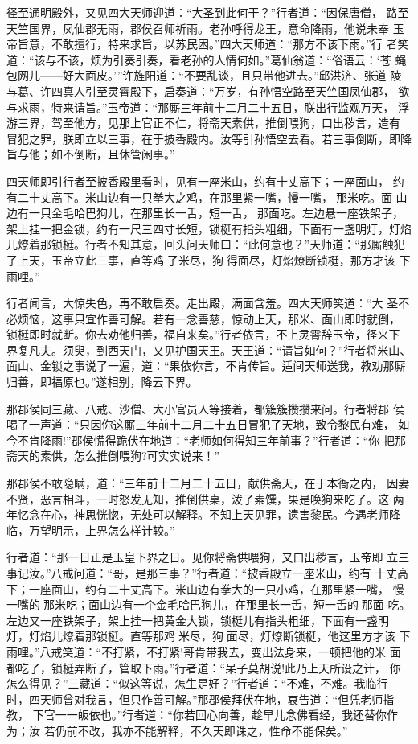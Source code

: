 径至通明殿外，又见四大天师迎道：“大圣到此何干？”行者道：“因保唐僧，
路至天竺国界，凤仙郡无雨，郡侯召师祈雨。老孙呼得龙王，意命降雨，他说未奉
玉帝旨意，不敢擅行，特来求旨，以苏民困。”四大天师道：“那方不该下雨。”行
者笑道：“该与不该，烦为引奏引奏，看老孙的人情何如。”葛仙翁道：“俗语云：‘苍
蝇包网儿——好大面皮。’”许旌阳道：“不要乱谈，且只带他进去。”邱洪济、张道
陵与葛、许四真人引至灵霄殿下，启奏道：“万岁，有孙悟空路至天竺国凤仙郡，
欲与求雨，特来请旨。”玉帝道：“那厮三年前十二月二十五日，朕出行监观万天，
浮游三界，驾至他方，见那上官正不仁，将斋天素供，推倒喂狗，口出秽言，造有
冒犯之罪，朕即立以三事，在于披香殿内。汝等引孙悟空去看。若三事倒断，即降
旨与他；如不倒断，且休管闲事。”

四天师即引行者至披香殿里看时，见有一座米山，约有十丈高下；一座面山，
约有二十丈高下。米山边有一只拳大之鸡，在那里紧一嘴，慢一嘴，那米吃。面
山边有一只金毛哈巴狗儿，在那里长一舌，短一舌，那面吃。左边悬一座铁架子，
架上挂一把金锁，约有一尺三四寸长短，锁梃有指头粗细，下面有一盏明灯，灯焰
儿燎着那锁梃。行者不知其意，回头问天师曰：“此何意也？”天师道：“那厮触犯
了上天，玉帝立此三事，直等鸡了米尽，狗得面尽，灯焰燎断锁梃，那方才该
下雨哩。”

行者闻言，大惊失色，再不敢启奏。走出殿，满面含羞。四大天师笑道：“大
圣不必烦恼，这事只宜作善可解。若有一念善慈，惊动上天，那米、面山即时就倒，
锁梃即时就断。你去劝他归善，福自来矣。”行者依言，不上灵霄辞玉帝，径来下
界复凡夫。须臾，到西天门，又见护国天王。天王道：“请旨如何？”行者将米山、
面山、金锁之事说了一遍，道：“果依你言，不肯传旨。适间天师送我，教劝那厮
归善，即福原也。”遂相别，降云下界。

那郡侯同三藏、八戒、沙僧、大小官员人等接着，都簇簇攒攒来问。行者将郡
侯喝了一声道：“只因你这厮三年前十二月二十五日冒犯了天地，致令黎民有难，
如今不肯降雨!”郡侯慌得跪伏在地道：“老师如何得知三年前事？”行者道：“你
把那斋天的素供，怎么推倒喂狗?可实实说来！”

那郡侯不敢隐瞒，道：“三年前十二月二十五日，献供斋天，在于本衙之内，
因妻不贤，恶言相斗，一时怒发无知，推倒供桌，泼了素馔，果是唤狗来吃了。这
两年忆念在心，神思恍惚，无处可以解释。不知上天见罪，遗害黎民。今遇老师降
临，万望明示，上界怎么样计较。”

行者道：“那一日正是玉皇下界之日。见你将斋供喂狗，又口出秽言，玉帝即
立三事记汝。”八戒问道：“哥，是那三事？”行者道：“披香殿立一座米山，约有
十丈高下；一座面山，约有二十丈高下。米山边有拳大的一只小鸡，在那里紧一嘴，
慢一嘴的那米吃；面山边有一个金毛哈巴狗儿，在那里长一舌，短一舌的那面
吃。左边又一座铁架子，架上挂一把黄金大锁，锁梃儿有指头粗细，下面有一盏明
灯，灯焰儿燎着那锁梃。直等那鸡米尽，狗面尽，灯燎断锁梃，他这里方才该
下雨哩。”八戒笑道：“不打紧，不打紧!哥肯带我去，变出法身来，一顿把他的米
面都吃了，锁梃弄断了，管取下雨。”行者道：“呆子莫胡说!此乃上天所设之计，
你怎么得见？”三藏道：“似这等说，怎生是好？”行者道：“不难，不难。我临行
时，四天师曾对我言，但只作善可解。”那郡侯拜伏在地，哀告道：“但凭老师指教，
下官一一皈依也。”行者道：“你若回心向善，趁早儿念佛看经，我还替你作为；汝
若仍前不改，我亦不能解释，不久天即诛之，性命不能保矣。”

